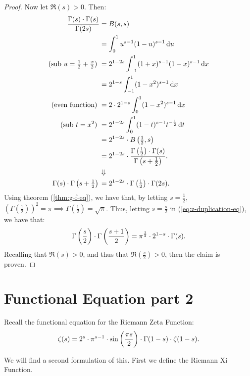 \begin{proof}
Now let $\Re(s) > 0$. Then:
\begin{align}
    \frac{\Gamma(s) \cdot \Gamma(s)}{\Gamma(2s)} &= B(s,s) \nonumber \\
    &= \int_0^1 u^{s-1} (1-u)^{s-1} \dif u \nonumber \\
    \text{(sub $u = \tfrac{1}{2}+ \tfrac{x}{2}$) } &= 2^{1-2s} \int_{-1}^1 (1+x)^{s-1} (1-x)^{s-1} \dif x \nonumber \\
    &= 2^{1-s} \int_{-1}^1 (1-x^2)^{s-1} \dif x \nonumber \\
    \text{(even function) } &= 2 \cdot 2^{1-s} \int_{0}^1 (1-x^2)^{s-1} \dif x \nonumber \\
    \text{(sub $t = x^2$) } &= 2^{1-2s} \int_0^1 (1-t)^{s-1} t^{-\frac{1}{2}} \dif t \nonumber \\
    &= 2^{1-2s} \cdot B \br{\tfrac{1}{2}, s} \nonumber \\
    &= 2^{1-2s} \cdot \frac{\Gamma\br{\tfrac{1}{2}} \cdot \Gamma(s)}{\Gamma\br{s+\tfrac{1}{2}}}. \nonumber \\
    &\Downarrow \nonumber \\
    \Gamma(s) \cdot \Gamma\br{s+\tfrac{1}{2}} {} &= 2^{1-2s} \cdot \Gamma\br{\tfrac{1}{2}} \cdot  \Gamma(2s) \label{eq:z-duplication-eq}.
\end{align}
Using theorem (\ref{thm:g-f-eq}), we have that, by letting $s = \tfrac{1}{2}$, $(\Gamma(\tfrac{1}{2}))^2 = \pi \implies \Gamma(\tfrac{1}{2}) = \sqrt{\pi}$. Thus, letting $s= \frac{s}{2}$ in (\ref{eq:z-duplication-eq}), we have that:
\begin{align*}
    \Gamma\left( \frac{s}{2} \right) \cdot \Gamma\left( \frac{s+1}{2} \right) = \pi ^{\frac{1}{2}} \cdot 2^{1-s} \cdot \Gamma(s).
\end{align*}
Recalling that $\Re(s) > 0$, and thus that $\Re(\tfrac{s}{2}) > 0$, then the claim is proven.
\end{proof}





\section{Functional Equation part 2}
Recall the functional equation for the Riemann Zeta Function:
\begin{align*}
    \zeta(s) = 2^s \cdot \pi^{s-1} \cdot \sin\left( \frac{\pi s}{2} \right) \cdot \Gamma(1-s) \cdot \zeta(1-s).
\end{align*}

We will find a second formulation of this. First we define the Riemann Xi Function.





